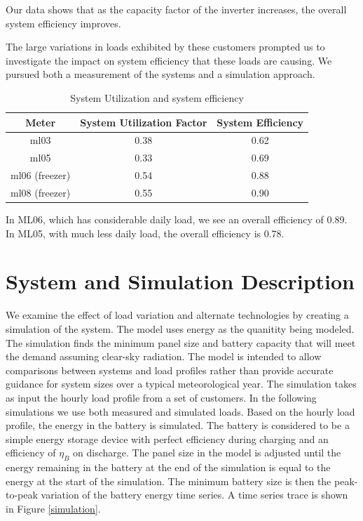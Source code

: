 \documentclass[conference]{IEEEtran}
\begin{document}
Our data shows that as the capacity factor of the inverter
increases, the overall system efficiency improves.

The large variations in loads exhibited by these customers prompted
us to investigate the impact on system efficiency that these
loads are causing.
We pursued both a measurement of the systems and a simulation approach.

\begin{table}
\centering
\begin{tabular}{c c c}
Meter & System Utilization Factor & System Efficiency \\
\hline
ml03 & 0.38 & 0.62 \\
ml05 & 0.33 & 0.69 \\
ml06 (freezer) & 0.54 & 0.88 \\
ml08 (freezer) & 0.55 & 0.90 \\
\end{tabular}
\caption{System Utilization and system efficiency}
\label{efficiency}
\end{table}




In ML06, which has considerable daily load, we see an overall
efficiency of 0.89.
In ML05, with much less daily load, the overall efficiency
is 0.78.

\section{System and Simulation Description}

We examine the effect of load variation and alternate technologies
by creating a simulation of the system.
The model uses energy as the quanitity being modeled.
The simulation finds the minimum panel size and battery capacity
that will meet the demand assuming clear-sky radiation.
The model is intended to allow comparisons between systems and
load profiles rather than provide accurate guidance for system
sizes over a typical meteorological year.
The simulation takes as input the hourly load profile from a
set of customers.
In the following simulations we use both measured and simulated
loads.
Based on the hourly load profile, the energy in the battery
is simulated.
The battery is considered to be a simple energy storage device
with perfect efficiency during charging and an efficiency of
$\eta_B$ on discharge.
The panel size in the model is adjusted until the energy remaining
in the battery at the end of the simulation is equal to the
energy at the start of the simulation.
The minimum battery size is then the peak-to-peak variation
of the battery energy time series.
A time series trace is shown in Figure \ref{simulation}.
\end{document}
